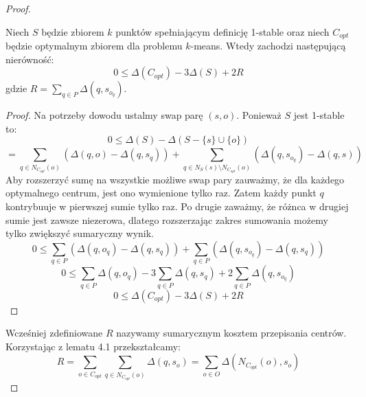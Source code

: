 \begin{proof}
    \begin{lemma}{\cite{Arya2004LocalSH}}
        Niech $S$ będzie zbiorem $k$ punktów spełniającym definicję 1-stable oraz niech $C_{opt}$ będzie optymalnym zbiorem dla problemu $k$-means.        Wtedy zachodzi następującą nierówność:
        \begin{equation}
            0 \leq \Delta(C_{opt}) - 3\Delta(S) + 2R
        \end{equation}
        gdzie $R = \sum_{q \in P} \Delta(q, s_{o_{q}})$.
    \end{lemma}
    \begin{proof}
        Na potrzeby dowodu ustalmy swap parę $(s, o)$.
        Ponieważ $S$ jest 1-stable to:
        \begin{equation}
           0 \leq \Delta(S) -  \Delta(S - \{s\} \cup \{o\})
        \end{equation}
        \begin{equation}
            = \sum_{q \in N_{C_{opt}}(o)} (\Delta(q, o) - \Delta(q, s_{q})) + \sum_{q \in N_{S}(s) \setminus N_{C_{opt}}(o)} (\Delta(q, s_{o_{q}}) - \Delta(q, s))
        \end{equation}
        Aby rozszerzyć sumę na wszystkie możliwe swap pary zauważmy, że dla każdego optymalnego centrum, jest ono wymienione tylko raz.
        Zatem każdy punkt $q$ kontrybuuje w pierwszej sumie tylko raz.
        Po drugie zaważmy, że różnca w drugiej sumie jest zawsze niezerowa, dlatego rozszerzając zakres sumowania możemy tylko zwiększyć sumaryczny wynik.
        \begin{equation}
            0 \leq \sum_{q \in P} (\Delta(q, o_{q}) - \Delta(q, s_{q})) + \sum_{q \in P} (\Delta(q, s_{o_{q}}) - \Delta(q, s_{q}))
        \end{equation}
        \begin{equation}
            0 \leq \sum_{q \in P} \Delta(q, o_{q}) - 3 \sum_{q \in P} \Delta(q, s_{q}) + 2\sum_{q \in P} \Delta(q, s_{o_{q}})
        \end{equation}
        \begin{equation}
            0 \leq \Delta(C_{opt}) - 3 \Delta(S) + 2R
        \end{equation}
    \end{proof}
    \noindent
    Wcześniej zdefiniowane $R$ nazywamy sumarycznym kosztem przepisania centrów.
    Korzystając z lematu 4.1 przekształcamy:
    \begin{equation}
        R = \sum_{o \in C_{opt}} \sum_{q \in N_{C_{opt}}(o)} \Delta(q, s_{o}) = \sum_{o \in O} \Delta(N_{C_{opt}}(o), s_{o}) 

\end{equation}
\end{proof}
